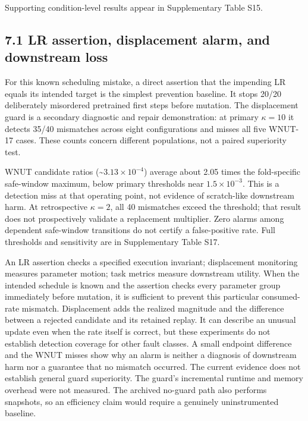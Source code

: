 \documentclass[smallextended]{svjour3}
\begin{document}
Supporting condition-level results appear in Supplementary Table S15.

\subsection{7.1 LR assertion, displacement alarm, and downstream loss}\label{lr-assertion-displacement-alarm-and-downstream-loss}

For this known scheduling mistake, a direct assertion that the impending LR equals its intended target is the simplest prevention baseline. It stops 20/20 deliberately misordered pretrained first steps before mutation. The displacement guard is a secondary diagnostic and repair demonstration: at primary \(\kappa=10\) it detects 35/40 mismatches across eight configurations and misses all five WNUT-17 cases. These counts concern different populations, not a paired superiority test.

WNUT candidate ratios (\textasciitilde{}\(3.13\times10^{-4}\)) average about 2.05 times the fold-specific safe-window maximum, below primary thresholds near \(1.5\times10^{-3}\). This is a detection miss at that operating point, not evidence of scratch-like downstream harm. At retrospective \(\kappa=2\), all 40 mismatches exceed the threshold; that result does not prospectively validate a replacement multiplier. Zero alarms among dependent safe-window transitions do not certify a false-positive rate. Full thresholds and sensitivity are in Supplementary Table S17.

An LR assertion checks a specified execution invariant; displacement monitoring measures parameter motion; task metrics measure downstream utility. When the intended schedule is known and the assertion checks every parameter group immediately before mutation, it is sufficient to prevent this particular consumed-rate mismatch. Displacement adds the realized magnitude and the difference between a rejected candidate and its retained replay. It can describe an unusual update even when the rate itself is correct, but these experiments do not establish detection coverage for other fault classes. A small endpoint difference and the WNUT misses show why an alarm is neither a diagnosis of downstream harm nor a guarantee that no mismatch occurred. The current evidence does not establish general guard superiority. The guard's incremental runtime and memory overhead were not measured. The archived no-guard path also performs snapshots, so an efficiency claim would require a genuinely uninstrumented baseline.
\end{document}
